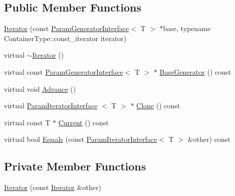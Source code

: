 \subsection*{\-Public \-Member \-Functions}
\begin{DoxyCompactItemize}
\item 
\hyperlink{classtesting_1_1internal_1_1ValuesInIteratorRangeGenerator_1_1Iterator_a512be9fa4410475294ae7b266cae019a}{\-Iterator} (const \hyperlink{classtesting_1_1internal_1_1ParamGeneratorInterface}{\-Param\-Generator\-Interface}$<$ \-T $>$ $\ast$base, typename \-Container\-Type\-::const\-\_\-iterator iterator)
\item 
virtual \hyperlink{classtesting_1_1internal_1_1ValuesInIteratorRangeGenerator_1_1Iterator_a47b331bac1d130f2bab2c40e76ccb54a}{$\sim$\-Iterator} ()
\item 
virtual const \*
\hyperlink{classtesting_1_1internal_1_1ParamGeneratorInterface}{\-Param\-Generator\-Interface}$<$ \-T $>$ $\ast$ \hyperlink{classtesting_1_1internal_1_1ValuesInIteratorRangeGenerator_1_1Iterator_a150e3ccaeb07362b8d88a94fecd4a6b6}{\-Base\-Generator} () const 
\item 
virtual void \hyperlink{classtesting_1_1internal_1_1ValuesInIteratorRangeGenerator_1_1Iterator_aaa5a890708f89affa1a7726cf152c872}{\-Advance} ()
\item 
virtual \hyperlink{classtesting_1_1internal_1_1ParamIteratorInterface}{\-Param\-Iterator\-Interface}\*
$<$ \-T $>$ $\ast$ \hyperlink{classtesting_1_1internal_1_1ValuesInIteratorRangeGenerator_1_1Iterator_a68b8ee0444cdc7c84f4a82e910e66893}{\-Clone} () const 
\item 
virtual const \-T $\ast$ \hyperlink{classtesting_1_1internal_1_1ValuesInIteratorRangeGenerator_1_1Iterator_a11285bd5236d32bdacd8fbeb6ecfa4c4}{\-Current} () const 
\item 
virtual bool \hyperlink{classtesting_1_1internal_1_1ValuesInIteratorRangeGenerator_1_1Iterator_af9c7ebdba09d6bd866f0967359e02ad8}{\-Equals} (const \hyperlink{classtesting_1_1internal_1_1ParamIteratorInterface}{\-Param\-Iterator\-Interface}$<$ \-T $>$ \&other) const 
\end{DoxyCompactItemize}
\subsection*{\-Private \-Member \-Functions}
\begin{DoxyCompactItemize}
\item 
\hyperlink{classtesting_1_1internal_1_1ValuesInIteratorRangeGenerator_1_1Iterator_a2b76c2e597bc9393f2b99e869e4fa8d2}{\-Iterator} (const \hyperlink{classtesting_1_1internal_1_1ValuesInIteratorRangeGenerator_1_1Iterator}{\-Iterator} \&other)
\end{DoxyCompactItemize}
